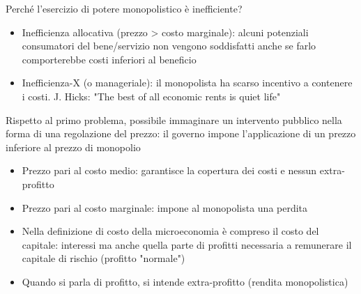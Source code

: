 \documentclass[aspectratio=149,11pt]{beamer}
\begin{document}
\begin{frame}{Perché l'esercizio di potere monopolistico è inefficiente?}
\begin{itemize}
\item \alert{Inefficienza allocativa} (prezzo > costo marginale): alcuni potenziali
consumatori del bene/servizio non vengono soddisfatti anche se farlo
comporterebbe costi inferiori al beneficio
\item \alert{Inefficienza-X} (o manageriale): il monopolista ha scarso incentivo a
contenere i costi. J. Hicks: "The best of all economic rents is quiet life"
\end{itemize}

Rispetto al primo problema, possibile immaginare un intervento pubblico nella
forma di una \alert{regolazione del prezzo}: il governo impone l'applicazione di un
prezzo inferiore al prezzo di monopolio

\begin{itemize}
\item Prezzo pari al \alert{costo medio}: garantisce la copertura dei costi e nessun
extra-profitto
\item Prezzo pari al \alert{costo marginale}: impone al monopolista una perdita
\end{itemize}
\begin{block}{}
\begin{itemize}
\item Nella definizione di costo della microeconomia è compreso il \alert{costo del
capitale}: interessi ma anche quella parte di profitti necessaria a remunerare
il capitale di rischio (profitto "normale")
\item Quando si parla di profitto, si intende extra-profitto (rendita monopolistica)
\end{itemize}
\end{block}
\end{frame}
\end{document}
